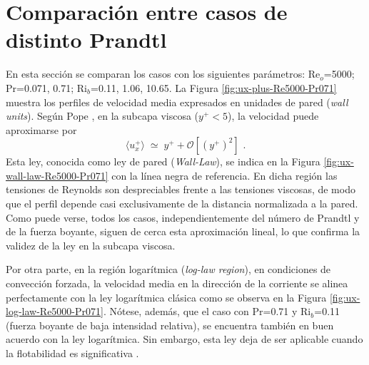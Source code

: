 \section{Comparación entre casos de distinto Prandtl}

En esta sección se comparan los casos con los siguientes parámetros: Re$_o$=5000; Pr=0.071, 0.71; Ri$_b$=0.11, 1.06, 10.65. La Figura \ref{fig:ux-plus-Re5000-Pr071} muestra los perfiles de velocidad media expresados en unidades de pared (\textit{wall units}). Según Pope \cite{pope2001turbulent}, en la subcapa viscosa ($y^+ < 5$), la velocidad puede aproximarse por
$$\langle u_x^+ \rangle \;\simeq\; y^+ + \mathcal{O} \left[(y^+)^{2} \right]\text{ .}$$
Esta ley, conocida como ley de pared (\textit{Wall-Law}), se indica en la Figura \ref{fig:ux-wall-law-Re5000-Pr071} con la línea negra de referencia. En dicha región las tensiones de Reynolds son despreciables frente a las tensiones viscosas, de modo que el perfil depende casi exclusivamente de la distancia normalizada a la pared. Como puede verse, todos los casos, independientemente del número de Prandtl y de la fuerza boyante, siguen de cerca esta aproximación lineal, lo que confirma la validez de la ley en la subcapa viscosa. 

Por otra parte, en la región logarítmica (\textit{log-law region}), en condiciones de convección forzada, la velocidad media en la dirección de la corriente se alinea perfectamente con la ley logarítmica clásica \cite{kawamura2000dns} como se observa en la Figura \ref{fig:ux-log-law-Re5000-Pr071}. Nótese, además, que el caso con Pr=0.71 y Ri$_b$=0.11 (fuerza boyante de baja intensidad relativa), se encuentra también en buen acuerdo con la ley logarítmica. Sin embargo, esta ley deja de ser aplicable cuando la flotabilidad es significativa \cite{zhou2024direct}.

